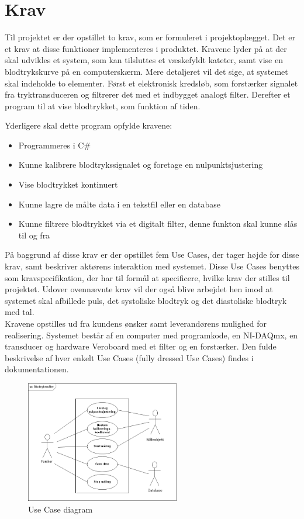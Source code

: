\chapter{Krav}
Til projektet er der opstillet to krav, som er formuleret i projektoplægget. Det er et krav at disse funktioner implementeres i produktet. Kravene lyder på at der skal udvikles et system, som kan tilsluttes et væskefyldt kateter, samt vise en blodtrykskurve på en computerskærm. Mere detaljeret vil det sige, at systemet skal indeholde to elementer. Først et elektronisk kredsløb, som forstærker signalet fra tryktransduceren og filtrerer det med et indbygget analogt filter. Derefter et program til at vise blodtrykket, som funktion af tiden.

Yderligere skal dette program opfylde kravene:
\begin{itemize}
\item Programmeres i C\#
\item Kunne kalibrere blodtrykssignalet og foretage en nulpunktsjustering
\item Vise blodtrykket kontinuert
\item Kunne lagre de målte data i en tekstfil eller en database
\item Kunne filtrere blodtrykket via et digitalt filter, denne funkton skal kunne slås til og fra
\end{itemize}

På baggrund af disse krav er der opstillet fem Use Cases, der tager højde for disse krav, samt beskriver aktørens interaktion med systemet. Disse Use Cases benyttes som kravspecifikation, der har til formål at specificere, hvilke krav der stilles til projektet. Udover ovennævnte krav vil der også blive arbejdet hen imod at systemet skal afbillede puls, det systoliske blodtryk og det diastoliske blodtryk med tal. \\
Kravene opstilles ud fra kundens ønsker samt leverandørens mulighed for realisering. Systemet består af en computer med programkode, en NI-DAQmx, en transducer og hardware Veroboard med et filter og en forstærker. Den fulde beskrivelse af hver enkelt Use Cases (fully dressed Use Cases) findes i dokumentationen. 

\begin{figure}[htb]
	\centering
	\includegraphics[width=0.6\textwidth]{Figurer/UseCasediagram}
	\caption{Use Case diagram}
\end{figure}

